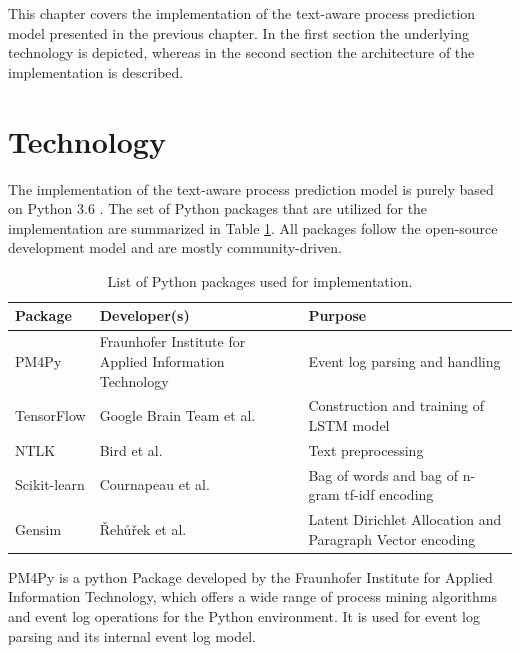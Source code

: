 This chapter covers the implementation of the text-aware process prediction model presented in the previous chapter.
In the first section the underlying technology is depicted, whereas in the second section the architecture of the implementation is described.

\section{Technology}

The implementation of the text-aware process prediction model is purely based on Python 3.6 \cite{python}.
The set of Python packages that are utilized for the implementation are summarized in Table \ref{tab:packages}.
All packages follow the open-source development model and are mostly community-driven.

\begin{table}[!htbp]
	\begin{tabularx}{\textwidth}{l p{4.5cm} p{6.6cm} }
		\toprule
		\textbf{Package} & \textbf{Developer(s)} & \textbf{Purpose}  \\
		\midrule
		PM4Py \cite{DBLP:journals/corr/abs-1905-06169}   &  Fraunhofer Institute for Applied Information Technology &  Event log parsing and handling\\
		TensorFlow \cite{DBLP:journals/corr/AbadiABBCCCDDDG16} &  Google Brain Team et al.& Construction and training of LSTM model \\
		NTLK \cite{DBLP:books/daglib/0022921} & Bird et al. & Text preprocessing\\
		Scikit-learn \cite{DBLP:journals/jmlr/PedregosaVGMTGBPWDVPCBPD11} & Cournapeau et al.& Bag of words and bag of n-gram tf-idf encoding \\
		Gensim \cite{rehurek_lrec} & Řehůřek et al. & Latent Dirichlet Allocation and Paragraph Vector encoding \\
		 \bottomrule
	\end{tabularx}
	\caption[List of Python packages used for implementation]{List of Python packages used for implementation.}
	\label{tab:packages}
\end{table}

PM4Py \cite{DBLP:journals/corr/abs-1905-06169} is a python Package developed by the Fraunhofer Institute for Applied Information Technology, which offers a wide range of process mining algorithms and event log operations for the Python environment.
It is used for event log parsing and its internal event log model.

